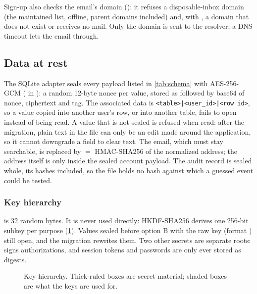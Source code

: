 Sign-up also checks the email's domain (): it refuses a disposable-inbox domain (the maintained
 list, offline, parent domains included) and, with , a domain that does not
exist or receives no mail. Only the domain is sent to the resolver; a DNS timeout lets the email through.

\subsection{Data at rest}\label{sec:at-rest}

The SQLite adapter seals every payload listed in \cref{tab:schema} with AES-256-GCM ( in
): a random 12-byte nonce per value, stored as
 followed by base64 of nonce, ciphertext and tag. The associated data is \texttt{<table>|<user\_id>|<row id>},
so a value copied into another user's row, or into another table, fails to open instead of being read. A value that
is not sealed is refused when read: after the migration, plain text in the file can only be an edit made around the
application, so it cannot downgrade a field to clear text. The email, which must stay searchable, is replaced by
 $=$ HMAC-SHA256 of the normalized address; the address itself is only inside the sealed account
payload. The audit record is sealed whole, its hashes included, so the file holds no hash against which a guessed
event could be tested.

\subsubsection{Key hierarchy}\label{sec:keys}

 is 32 random bytes. It is never used directly: HKDF-SHA256 derives one 256-bit subkey per purpose
(\cref{fig:keys}). Values sealed before option B with the raw key (format ) still open, and the migration
rewrites them. Two other secrets are separate roots:  signs authorizations, and session tokens and
passwords are only ever stored as digests.

\begin{figure}[htbp]
  \centering
  
  \caption{Key hierarchy. Thick-ruled boxes are secret material; shaded boxes are what the keys are used for.}\label{fig:keys}
\end{figure}

